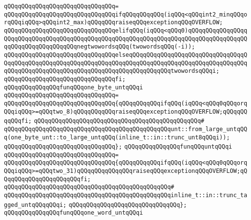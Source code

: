 \verb|qQQqqQQqqQQqqQQqqQQqqQQqqQQqqQQq=|\newline
\verb|qQQqqQQqqQQqqQQqqQQqqQQqqQQqqQQqifqQQqqQQqqQQq(iqQQq<qQQqint2_minqQQqorqQQqiqQQq>qQQqint2_max)qQQqqQQqraiseqQQqexceptionqQQqOVERFLOW;|\newline
\verb|qQQqqQQqqQQqqQQqqQQqqQQqqQQqqQQqelifqQQq(iqQQq<qQQq0)qQQqqQQqqQQqqQQqqQQqqQQqqQQqqQQqqQQqqQQqqQQqqQQqqQQqqQQqqQQqqQQqqQQqqQQqqQQqqQQqqQQqqQQqqQQqqQQqqQQqqQQqqQQqnegtwowordsqQQq(twowordsqQQq(-i));|\newline
\verb|qQQqqQQqqQQqqQQqqQQqqQQqqQQqqQQqelseqQQqqQQqqQQqqQQqqQQqqQQqqQQqqQQqqQQqqQQqqQQqqQQqqQQqqQQqqQQqqQQqqQQqqQQqqQQqqQQqqQQqqQQqqQQqqQQqqQQqqQQqqQQqqQQqqQQqqQQqqQQqqQQqqQQqqQQqqQQqqQQqqQQqqQQqtwowordsqQQqi;|\newline
\verb|qQQqqQQqqQQqqQQqqQQqqQQqqQQqqQQqfi;|\newline
\newline
\verb|qQQqqQQqqQQqqQQqfunqQQqone_byte_untqQQqi|\newline
\verb|qQQqqQQqqQQqqQQqqQQqqQQqqQQqqQQq=|\newline
\verb|qQQqqQQqqQQqqQQqqQQqqQQqqQQqqQQq{qQQqqQQqqQQqifqQQq(iqQQq<qQQq0qQQqorqQQqiqQQq>=qQQqtwo_8)qQQqqQQqqQQqraiseqQQqexceptionqQQqOVERFLOW;qQQqqQQqqQQqfi;|\newline
\verb|qQQqqQQqqQQqqQQqqQQqqQQqqQQqqQQqqQQqqQQqqQQqqQQq#|\newline
\verb|qQQqqQQqqQQqqQQqqQQqqQQqqQQqqQQqqQQqqQQqqQQqqQQqunt::from_large_untqQQq(one_byte_unt::to_large_untqQQq(inline_t::in::trunc_unt8qQQqi));|\newline
\verb|qQQqqQQqqQQqqQQqqQQqqQQqqQQqqQQq};|\newline
\newline
\verb|qQQqqQQqqQQqqQQqfunqQQquntqQQqi|\newline
\verb|qQQqqQQqqQQqqQQqqQQqqQQqqQQqqQQq=|\newline
\verb|qQQqqQQqqQQqqQQqqQQqqQQqqQQqqQQq{qQQqqQQqqQQqifqQQq(iqQQq<qQQq0qQQqorqQQqiqQQq>=qQQqtwo_31)qQQqqQQqqQQqqQQqraiseqQQqexceptionqQQqOVERFLOW;qQQqqQQqqQQqqQQqqQQqqQQqfi;|\newline
\verb|qQQqqQQqqQQqqQQqqQQqqQQqqQQqqQQqqQQqqQQqqQQqqQQq#|\newline
\verb|qQQqqQQqqQQqqQQqqQQqqQQqqQQqqQQqqQQqqQQqqQQqqQQqinline_t::in::trunc_tagged_untqQQqqQQqi;|\newline
\verb|qQQqqQQqqQQqqQQqqQQqqQQqqQQqqQQq};|\newline
\newline
\verb|qQQqqQQqqQQqqQQqfunqQQqone_word_untqQQqi|\newline
